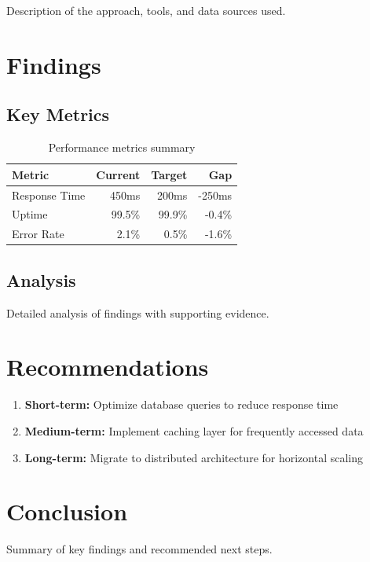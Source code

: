 \documentclass[12pt,a4paper]{article}
\begin{document}
Description of the approach, tools, and data sources used.

\section{Findings}

\subsection{Key Metrics}

\begin{table}[h]
\centering
\begin{tabular}{lrrr}
\toprule
\textbf{Metric} & \textbf{Current} & \textbf{Target} & \textbf{Gap} \\
\midrule
Response Time & 450ms & 200ms & -250ms \\
Uptime & 99.5\% & 99.9\% & -0.4\% \\
Error Rate & 2.1\% & 0.5\% & -1.6\% \\
\bottomrule
\end{tabular}
\caption{Performance metrics summary}
\end{table}

\subsection{Analysis}

Detailed analysis of findings with supporting evidence.

\section{Recommendations}

\begin{enumerate}
  \item \textbf{Short-term:} Optimize database queries to reduce response time
  \item \textbf{Medium-term:} Implement caching layer for frequently accessed data
  \item \textbf{Long-term:} Migrate to distributed architecture for horizontal scaling
\end{enumerate}

\section{Conclusion}

Summary of key findings and recommended next steps.
\end{document}
